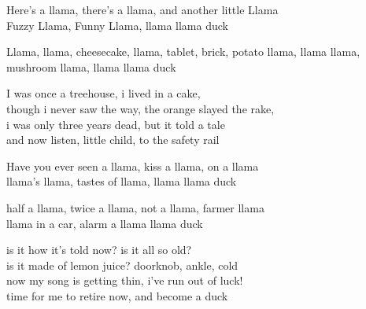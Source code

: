\vspace{10pt}
Here's a llama, there's a llama, and another little Llama\\
Fuzzy Llama, Funny Llama, llama llama duck\par
\vspace{10pt}
Llama, llama, cheesecake, llama, tablet, brick, potato llama, llama llama, mushroom llama, llama llama duck\par
\vspace{10pt}
I was once a treehouse, i lived in a cake,\\
though i never saw the way, the orange slayed the rake,\\
i was only three years dead, but it told a tale\\
and now listen, little child, to the safety rail\par
\vspace{10pt}
Have you ever seen a llama, kiss a llama, on a llama\\
llama's llama, tastes of llama, llama llama duck\par
\vspace{10pt}
half a llama, twice a llama, not a llama, farmer llama\\
llama in a car, alarm a llama llama duck\par
\vspace{10pt}
is it how it's told now? is it all so old?\\
is it made of lemon juice? doorknob, ankle, cold\\
now my song is getting thin, i've run out of luck!\\
time for me to retire now, and become a duck
